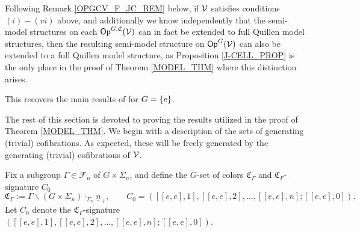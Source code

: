 \documentclass[a4paper,10pt
,draft
]{article}%
\renewcommand{\F}{\mathcal F}
\renewcommand{\1}{\eta}%
\begin{document}

\begin{remark}
      \label{OPGCV_FULL_REM}
      Following Remark \ref{OPGCV_F_JC_REM} below, if $\mathcal V$ satisfies conditions $(i) - (vi)$ above,
      and additionally we know independently that
      the semi-model structures on each $\mathsf{Op}^{G, \mathfrak C}(\mathcal V)$ can in fact be extended to full Quillen model structures,
      then the resulting semi-model structure on $\mathsf{Op}^G(\mathcal V)$ can also be extended to a full Quillen model structure,
      as Proposition \ref{J-CELL_PROP} is the only place in the proof of Theorem \ref{MODEL_THM} where this distinction arises.
\end{remark}

\begin{remark}
      This recovers the main results of \cite{BM13, Cav} for $G = \left\{e\right\}$. 
\end{remark}



The rest of this section is devoted to proving the results utilized in the proof of Theorem \ref{MODEL_THM}.
We begin with a description of the sets of generating (trivial) cofibrations.
As expected, these will be freely generated by the generating (trivial) cofibrations of $\mathcal V$.

Fix a subgroup $\Gamma \in \F_n$ of $G \times \Sigma_n$,
and define the $G$-set of colors $\mathfrak C_\Gamma$ and $\mathfrak C_\Gamma$-signature $C_0$
\[
      \mathfrak C_\Gamma := \Gamma \backslash (G \times \Sigma_n) \cdot_{\Sigma_n} \underline{n}_+,
      \qquad
      C_0 = ([[e,e],1],[[e,e],2],\dots,[[e,e],n];[[e,e],0]).
\]
Let $C_0$ denote the $\mathfrak C_\Gamma$-signature $([[e,e],1],[[e,e],2],\dots,[[e,e],n];[[e,e],0])$.
\end{document}
